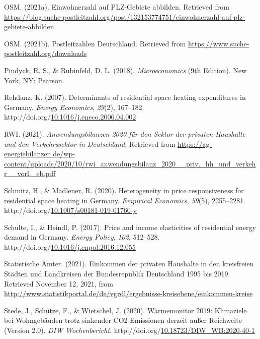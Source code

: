 \documentclass[12pt,twoside]{reedthesis}
\newlength{\cslhangindent}
\newenvironment{CSLReferences}[2] %
 {%
  \setlength{\parindent}{0pt}
  \ifodd #1 \everypar{\setlength{\hangindent}{\cslhangindent}}\ignorespaces\fi
  \ifnum #2 > 0
  \setlength{\parskip}{#2\baselineskip}
  \fi
 }%
 {}
\begin{document}
\begin{CSLReferences}{1}{0}
\leavevmode{}%
OSM. (2021a). Einwohnerzahl auf PLZ-Gebiete abbilden. Retrieved from \url{https://blog.suche-postleitzahl.org/post/132153774751/einwohnerzahl-auf-plz-gebiete-abbilden}

\leavevmode{}%
OSM. (2021b). Postleitzahlen Deutschland. Retrieved from \url{https://www.suche-postleitzahl.org/downloads}

\leavevmode{}%
Pindyck, R. S., \& Rubinfeld, D. L. (2018). \emph{Microeconomics} (9th Edition). New York, NY: Pearson.

\leavevmode{}%
Rehdanz, K. (2007). Determinants of residential space heating expenditures in Germany. \emph{Energy Economics}, \emph{29}(2), 167--182. http://doi.org/\href{https://doi.org/10.1016/j.eneco.2006.04.002}{10.1016/j.eneco.2006.04.002}

\leavevmode{}%
RWI. (2021). \emph{Anwendungsbilanzen 2020 für den Sektor der privaten Haushalte und den Verkehrssektor in Deutschland}. Retrieved from \url{https://ag-energiebilanzen.de/wp-content/uploads/2020/10/rwi_anwendungsbilanz_2020__priv._hh_und_verkehr__vorl._eb.pdf}

\leavevmode{}%
Schmitz, H., \& Madlener, R. (2020). Heterogeneity in price responsiveness for residential space heating in Germany. \emph{Empirical Economics}, \emph{59}(5), 2255--2281. http://doi.org/\href{https://doi.org/10.1007/s00181-019-01760-y}{10.1007/s00181-019-01760-y}

\leavevmode{}%
Schulte, I., \& Heindl, P. (2017). Price and income elasticities of residential energy demand in Germany. \emph{Energy Policy}, \emph{102}, 512--528. http://doi.org/\href{https://doi.org/10.1016/j.enpol.2016.12.055}{10.1016/j.enpol.2016.12.055}

\leavevmode{}%
Statistische Ämter. (2021). Einkommen der privaten Haushalte in den kreisfreien Städten und Landkreisen der Bundesrepublik Deutschland 1995 bis 2019. Retrieved November 12, 2021, from \url{http://www.statistikportal.de/de/vgrdl/ergebnisse-kreisebene/einkommen-kreise}

\leavevmode{}%
Stede, J., Schütze, F., \& Wietschel, J. (2020). Wärmemonitor 2019: Klimaziele bei Wohngebäuden trotz sinkender CO2-Emissionen derzeit außer Reichweite (Version 2.0). \emph{DIW Wochenbericht}. http://doi.org/\href{https://doi.org/10.18723/DIW_WB:2020-40-1}{10.18723/DIW\_WB:2020-40-1}


\end{CSLReferences}
\end{document}
